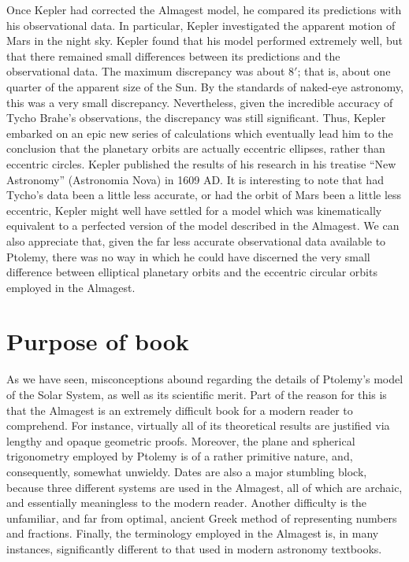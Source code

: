  Once Kepler had corrected the Almagest model, he compared its predictions
 with his observational data. In particular, Kepler investigated 
 the apparent motion of Mars in the night sky. Kepler found that his  model performed extremely well,
 but that there remained small differences between its predictions and the observational data. The maximum discrepancy was about $8'$; that is, about one
 quarter of the apparent size of the
 Sun. By the standards of naked-eye astronomy, this was a very small discrepancy. Nevertheless, given the incredible accuracy of Tycho Brahe's
 observations, the discrepancy was still significant. Thus, Kepler embarked on an epic new series
 of calculations which eventually lead him to the conclusion that the
 planetary orbits are actually eccentric ellipses, rather than eccentric circles. 
 Kepler published the results of his research in  his treatise ``New Astronomy''  (Astronomia Nova) in 1609 AD.
 It is
 interesting to note that had Tycho's data been a little less accurate,
 or had the orbit of Mars been a little less eccentric, Kepler might well 
 have settled for a model which was kinematically equivalent to
 a perfected version of the model described in the Almagest. We can also
 appreciate that, given the far less accurate observational data available to
 Ptolemy, there was no way in which he could have discerned the
 very small difference between elliptical planetary orbits and the eccentric
 circular orbits employed in the Almagest.
 
\section{Purpose of book}
As we have seen, misconceptions abound regarding the details of Ptolemy's model of the Solar System, as well as  its scientific merit. Part of the reason for this is 
that the Almagest is an extremely difficult book for a
modern reader to comprehend.  For instance, virtually all of its theoretical results are justified via lengthy  and opaque geometric
proofs. Moreover, the  plane and
spherical trigonometry employed by Ptolemy is of a rather primitive  nature, and,
consequently, somewhat unwieldy. Dates are also a major stumbling block, because three different systems are used in the Almagest,
all of which are archaic, and essentially meaningless to the modern reader.
Another difficulty is the unfamiliar, and far from optimal, ancient Greek method of representing numbers and fractions.
Finally, the terminology employed in the Almagest is, in many instances, significantly different to that used in modern
astronomy textbooks.

